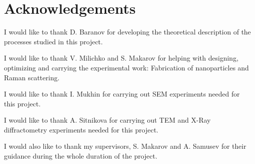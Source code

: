 \section*{Acknowledgements}

        I would like to thank D. Baranov for developing the theoretical description of the processes studied in this project.

        I would like to thank V. Milichko and S. Makarov for helping with designing, optimizing and carrying the experimental work:
    Fabrication of nanoparticles and Raman scattering.

        I would like to thank I. Mukhin for carrying out SEM experiments needed for this project.

        I would like to thank A. Sitnikova for carrying out TEM and X-Ray diffractometry experiments needed for this project.

        I would also like to thank my supervisors, S. Makarov and A. Samusev for their guidance during the whole duration of the project.


\clearpage
